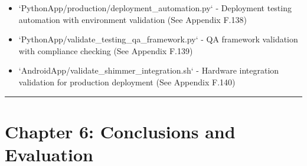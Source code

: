\documentclass[11pt,a4paper]{report}
\begin{document}
\begin{itemize}
\item `PythonApp/production/deployment_automation.py` - Deployment testing automation with environment validation (See
  Appendix F.138)
\item `PythonApp/validate_testing_qa_framework.py` - QA framework validation with compliance checking (See Appendix F.139)
\item `AndroidApp/validate_shimmer_integration.sh` - Hardware integration validation for production deployment (See Appendix
  F.140)

\end{itemize}
\hrule

\section{Chapter 6: Conclusions and Evaluation}
\end{document}
